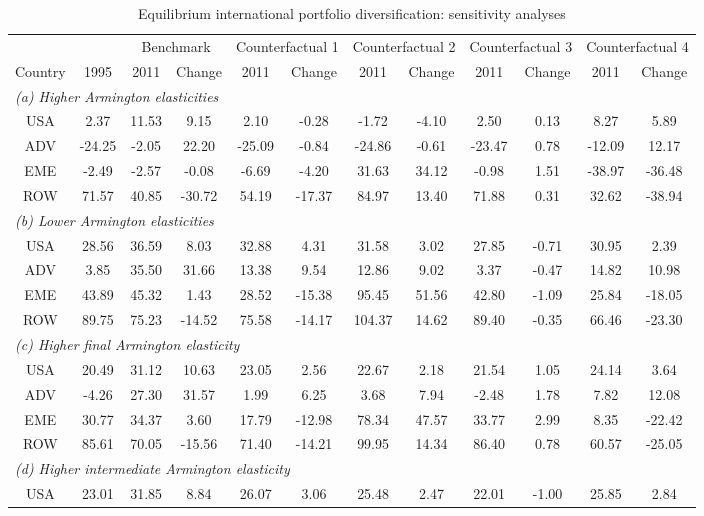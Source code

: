 \begin{table}[p]
\begin{center}
\caption{Equilibrium international portfolio diversification: sensitivity analyses}
\label{tab:results-div-sens}
\small
\begin{tabular}{cccccccccccc}
\toprule
& & \multicolumn{2}{c}{Benchmark}& \multicolumn{2}{c}{Counterfactual 1}& \multicolumn{2}{c}{Counterfactual 2}& \multicolumn{2}{c}{Counterfactual 3}& \multicolumn{2}{c}{Counterfactual 4}\\
\cmidrule(rl){3-4}\cmidrule(rl){5-6}\cmidrule(rl){7-8}\cmidrule(rl){9-10}\cmidrule(rl){11-12}
Country & 1995 & 2011 & Change & 2011 & Change & 2011 & Change & 2011 & Change & 2011 & Change\\
\midrule
\multicolumn{12}{l}{\textit{(a) Higher Armington elasticities}}\\
USA&2.37&11.53&9.15&2.10&-0.28&-1.72&-4.10&2.50&0.13&8.27&5.89\\
ADV&-24.25&-2.05&22.20&-25.09&-0.84&-24.86&-0.61&-23.47&0.78&-12.09&12.17\\
EME&-2.49&-2.57&-0.08&-6.69&-4.20&31.63&34.12&-0.98&1.51&-38.97&-36.48\\
ROW&71.57&40.85&-30.72&54.19&-17.37&84.97&13.40&71.88&0.31&32.62&-38.94\\
\midrule
\multicolumn{12}{l}{\textit{(b) Lower Armington elasticities}}\\
USA&28.56&36.59&8.03&32.88&4.31&31.58&3.02&27.85&-0.71&30.95&2.39\\
ADV&3.85&35.50&31.66&13.38&9.54&12.86&9.02&3.37&-0.47&14.82&10.98\\
EME&43.89&45.32&1.43&28.52&-15.38&95.45&51.56&42.80&-1.09&25.84&-18.05\\
ROW&89.75&75.23&-14.52&75.58&-14.17&104.37&14.62&89.40&-0.35&66.46&-23.30\\
\midrule
\multicolumn{12}{l}{\textit{(c) Higher final Armington elasticity}}\\
USA&20.49&31.12&10.63&23.05&2.56&22.67&2.18&21.54&1.05&24.14&3.64\\
ADV&-4.26&27.30&31.57&1.99&6.25&3.68&7.94&-2.48&1.78&7.82&12.08\\
EME&30.77&34.37&3.60&17.79&-12.98&78.34&47.57&33.77&2.99&8.35&-22.42\\
ROW&85.61&70.05&-15.56&71.40&-14.21&99.95&14.34&86.40&0.78&60.57&-25.05\\
\midrule
\multicolumn{12}{l}{\textit{(d) Higher intermediate Armington elasticity}}\\
USA&23.01&31.85&8.84&26.07&3.06&25.48&2.47&22.01&-1.00&25.85&2.84\\

\end{tabular}
\end{center}
\end{table}
